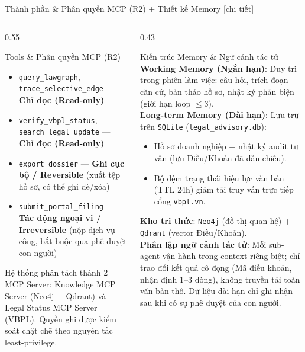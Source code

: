 \documentclass[aspectratio=169,10pt]{beamer}
\begin{document}
\begin{frame}{Thành phần \& Phân quyền MCP (R2) + Thiết kế Memory [chi tiết]}
\begin{columns}[T]
\begin{column}{0.55\textwidth}
\begin{block}{\small Tools \& Phân quyền MCP (R2)}
\scriptsize
\begin{itemize}
  \item \texttt{query\_lawgraph}, \texttt{trace\_selective\_edge} --- \textcolor{green!55!black}{\textbf{Chỉ đọc (Read-only)}}
  \item \texttt{verify\_vbpl\_status}, \texttt{search\_legal\_update} --- \textcolor{green!55!black}{\textbf{Chỉ đọc (Read-only)}}
  \item \texttt{export\_dossier} --- \textcolor{orange!80!black}{\textbf{Ghi cục bộ / Reversible}} (xuất tệp hồ sơ, có thể ghi đè/xóa)
  \item \texttt{submit\_portal\_filing} --- \textcolor{red!70!black}{\textbf{Tác động ngoại vi / Irreversible}} (nộp dịch vụ công, bắt buộc qua phê duyệt con người)
\end{itemize}
\end{block}
{\scriptsize Hệ thống phân tách thành 2 MCP Server: Knowledge MCP Server (Neo4j + Qdrant) và Legal Status MCP Server (VBPL). Quyền ghi được kiểm soát chặt chẽ theo nguyên tắc least-privilege.}
\end{column}
\begin{column}{0.43\textwidth}
\begin{block}{\small Kiến trúc Memory \& Ngữ cảnh tác tử}
\scriptsize
\textbf{Working Memory (Ngắn hạn)}: Duy trì trong phiên làm việc: câu hỏi, trích đoạn căn cứ, bản thảo hồ sơ, nhật ký phản biện (giới hạn loop $\le 3$).\\[0.1cm]
\textbf{Long-term Memory (Dài hạn)}: Lưu trữ trên \texttt{SQLite} (\texttt{legal\_advisory.db}):
\begin{itemize}\scriptsize
  \item Hồ sơ doanh nghiệp + nhật ký audit tư vấn (lưu Điều/Khoản đã dẫn chiếu).
  \item Bộ đệm trạng thái hiệu lực văn bản (TTL 24h) giảm tải truy vấn trực tiếp cổng \texttt{vbpl.vn}.
\end{itemize}
\textbf{Kho tri thức}: \texttt{Neo4j} (đồ thị quan hệ) + \texttt{Qdrant} (vector Điều/Khoản).\\[0.05cm]
\textbf{Phân lập ngữ cảnh tác tử}: Mỗi sub-agent vận hành trong context riêng biệt; chỉ trao đổi kết quả cô đọng (Mã điều khoản, nhận định 1--3 dòng), không truyền tải toàn văn bản thô. Dữ liệu dài hạn chỉ ghi nhận sau khi có sự phê duyệt của con người.
\end{block}
\end{column}
\end{columns}
\end{frame}
\end{document}
